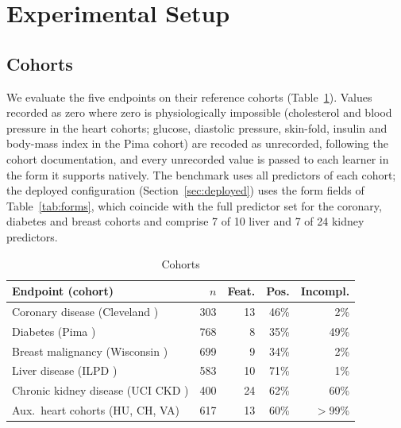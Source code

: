 \section{Experimental Setup}\label{sec:setup}
\subsection{Cohorts}
We evaluate the five endpoints on their reference cohorts (Table~\ref{tab:cohorts}). Values recorded as zero where zero is physiologically impossible (cholesterol and blood pressure in the heart cohorts; glucose, diastolic pressure, skin-fold, insulin and body-mass index in the Pima cohort) are recoded as unrecorded, following the cohort documentation, and every unrecorded value is passed to each learner in the form it supports natively. The benchmark uses all predictors of each cohort; the deployed configuration (Section~\ref{sec:deployed}) uses the form fields of Table~\ref{tab:forms}, which coincide with the full predictor set for the coronary, diabetes and breast cohorts and comprise 7 of 10 liver and 7 of 24 kidney predictors.

\begin{table}[!t]
\caption{Cohorts}
\label{tab:cohorts}
\centering\footnotesize
\setlength{\tabcolsep}{3pt}
\begin{tabular}{@{}lrrrr@{}}
\toprule
Endpoint (cohort) & $n$ & Feat. & Pos. & Incompl.\\
\midrule
Coronary disease (Cleveland \cite{uciheart}) & 303 & 13 & 46\% & 2\%\\
Diabetes (Pima \cite{pima}) & 768 & 8 & 35\% & 49\%\\
Breast malignancy (Wisconsin \cite{wolberg1990}) & 699 & 9 & 34\% & 2\%\\
Liver disease (ILPD \cite{uilpd}) & 583 & 10 & 71\% & 1\%\\
Chronic kidney disease (UCI CKD \cite{uckd}) & 400 & 24 & 62\% & 60\%\\
\midrule
Aux.\ heart cohorts (HU, CH, VA) & 617 & 13 & 60\% & $>$99\%\\
\bottomrule
\end{tabular}
\end{table}

